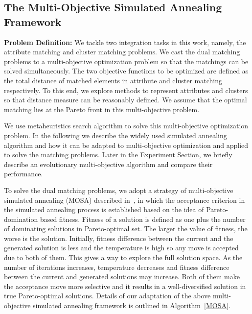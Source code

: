 \subsection{The Multi-Objective Simulated Annealing Framework}
\textbf{Problem Definition:} We tackle two integration tasks in this work, namely, the attribute matching and cluster matching problems. We cast the dual matching problems to a multi-objective optimization problem so that the matchings can be solved simultaneously. The two objective functions to be optimized are defined as the total distance of matched elements in attribute and cluster matching respectively. To this end, we explore methods to represent attributes and clusters so that distance measure can be reasonably defined. We assume that the optimal matching lies at the Pareto front in this multi-objective problem.

We use metaheuristics search algorithm to solve this multi-objective optimization problem. In the following we describe the widely used simulated annealing algorithm and how it can be adapted to multi-objective optimization and applied to solve the matching problems. Later in the Experiment Section, we briefly describe an evolutionary multi-objective algorithm and compare their performance.

To solve the dual matching problems, we adopt a strategy of multi-objective simulated annealing (MOSA) described in~\cite{Suman2003}, in which the acceptance criterion in the simulated annealing process is established based on the idea of Pareto-domination based fitness. Fitness of a solution is defined as one plus the number of dominating solutions in Pareto-optimal set. The larger the value of fitness, the worse is the solution. Initially, fitness difference between the current and the generated solution is less and the temperature is high so any move is accepted due to both of them. This gives a way to explore the full solution space. As the number of iterations increases, temperature decreases and fitness difference between the current and generated solutions may increase. Both of them make the acceptance move more selective and it results in a well-diversified solution in true Pareto-optimal solutions. Details of our adaptation of the above multi-objective simulated annealing framework is outlined in Algorithm~\ref{MOSA}.


